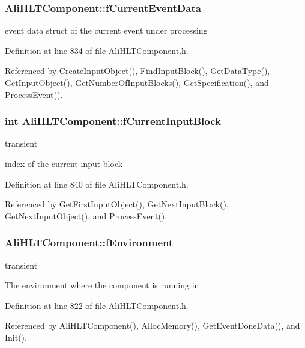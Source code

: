 \subsubsection{ {\bf Ali\-HLTComponent::f\-Current\-Event\-Data}\hspace{0.3cm}{\tt  [private]}}\label{classAliHLTComponent_r4}


event data struct of the current event under processing 

Definition at line 834 of file Ali\-HLTComponent.h.

Referenced by Create\-Input\-Object(), Find\-Input\-Block(), Get\-Data\-Type(), Get\-Input\-Object(), Get\-Number\-Of\-Input\-Blocks(), Get\-Specification(), and Process\-Event().
\subsubsection{\setlength{\rightskip}{0pt plus 5cm}int {\bf Ali\-HLTComponent::f\-Current\-Input\-Block}\hspace{0.3cm}{\tt  [private]}}\label{classAliHLTComponent_r6}


transient 

index of the current input block 

Definition at line 840 of file Ali\-HLTComponent.h.

Referenced by Get\-First\-Input\-Object(), Get\-Next\-Input\-Block(), Get\-Next\-Input\-Object(), and Process\-Event().
\subsubsection{ {\bf Ali\-HLTComponent::f\-Environment}\hspace{0.3cm}{\tt  [private]}}\label{classAliHLTComponent_r0}


transient 

The environment where the component is running in 

Definition at line 822 of file Ali\-HLTComponent.h.

Referenced by Ali\-HLTComponent(), Alloc\-Memory(), Get\-Event\-Done\-Data(), and Init().
